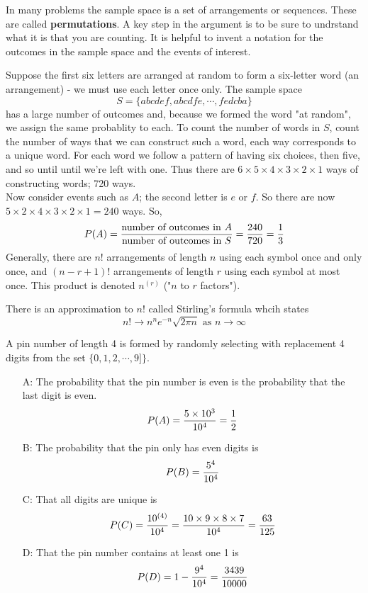 \documentclass[english, 11pt]{article}
\begin{document}
  \begin{rem}
    In many problems the sample space is a set of arrangements or sequences. These are called \textbf{permutations}. A key step in the argument is to be sure to undrstand what it is that you are counting. It is helpful to invent a notation for the outcomes in the sample space and the events of interest.
  \end{rem}
  \begin{exmp}
    Suppose the first six letters are arranged at random to form a six-letter word (an arrangement) - we must use each letter once only. The sample space
    \[ S = \{ abcdef, abcdfe, \cdots, fedcba\} \]
    has a large number of outcomes and, because we formed the word "at random", we assign the same probablity to each. To count the number of words in $S$, count the number of ways that we can construct such a word, each way corresponds to a unique word. For each word we follow a pattern of having six choices, then five, and so until until we're left with one. Thus there are $6\times5\times4\times3\times2\times1$ ways of constructing words; 720 ways. \\
    Now consider events such as $A$; the second letter is $e$ or $f$. So there are now $5\times2\times4\times3\times2\times1 = 240$ ways. So,
    \[ P(A) = \frac{\mbox{number of outcomes in $A$}}{\mbox{number of outcomes in $S$}} = \frac{240}{720} = \frac{1}{3} \]
    Generally, there are $n!$ arrangements of length $n$ using each symbol once and only once, and $(n-r+1)!$ arrangements of length $r$ using each symbol at most once. This product is denoted $n^{(r)}$ ("$n$ to $r$ factors").
  \end{exmp}
  There is an approximation to $n!$ called Stirling's formula whcih states
  \[ n! \rightarrow n^ne^{-n}\sqrt{2\pi n} \mbox{ as } n \rightarrow \infty \]

  \begin{exmp}
    A pin number of length 4 is formed by randomly selecting with replacement 4 digits from the set $\{0,1,2,\cdots,9]\}$.
    \begin{itemize}
      \item[A:] The probability that the pin number is even is the probability that the last digit is even.
      \[ P(A) = \frac{5\times10^3}{10^4} = \frac{1}{2} \]
      \item[B:] The probability that the pin only has even digits is
      \[ P(B) = \frac{5^4}{10^4} \]
      \item[C:] That all digits are unique is
      \[ P(C) = \frac{10^{(4)}}{10^4} = \frac{10\times9\times8\times7}{10^4} = \frac{63}{125} \]
      \item[D:] That the pin number contains at least one 1 is
      \[ P(D) = 1- \frac{9^4}{10^4} = \frac{3439}{10000} \]
    \end{itemize}
  \end{exmp}
\end{document}
